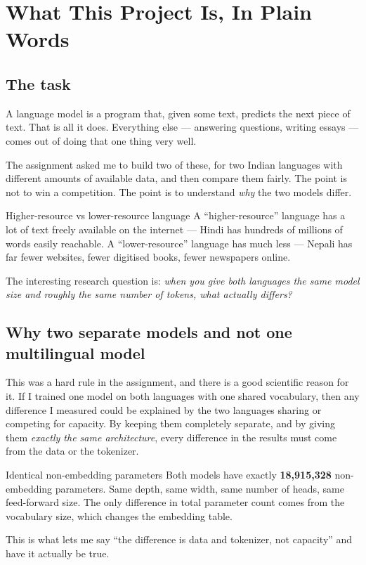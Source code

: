 \documentclass[11pt]{report}
\begin{document}
\chapter{What This Project Is, In Plain Words}

\section{The task}

A language model is a program that, given some text, predicts the next piece of
text. That is all it does. Everything else --- answering questions, writing
essays --- comes out of doing that one thing very well.

The assignment asked me to build two of these, for two Indian languages with
different amounts of available data, and then compare them fairly. The point is
not to win a competition. The point is to understand \emph{why} the two models
differ.

\begin{concept}{Higher-resource vs lower-resource language}
A ``higher-resource'' language has a lot of text freely available on the
internet --- Hindi has hundreds of millions of words easily reachable. A
``lower-resource'' language has much less --- Nepali has far fewer websites,
fewer digitised books, fewer newspapers online.

The interesting research question is: \emph{when you give both languages the
same model size and roughly the same number of tokens, what actually differs?}
\end{concept}

\section{Why two separate models and not one multilingual model}

This was a hard rule in the assignment, and there is a good scientific reason
for it. If I trained one model on both languages with one shared vocabulary,
then any difference I measured could be explained by the two languages sharing
or competing for capacity. By keeping them completely separate, and by giving
them \emph{exactly the same architecture}, every difference in the results must
come from the data or the tokenizer.

\begin{implementation}{Identical non-embedding parameters}
Both models have exactly \textbf{18,915,328} non-embedding parameters. Same
depth, same width, same number of heads, same feed-forward size. The only
difference in total parameter count comes from the vocabulary size, which
changes the embedding table.

This is what lets me say ``the difference is data and tokenizer, not capacity''
and have it actually be true.
\end{implementation}
\end{document}

